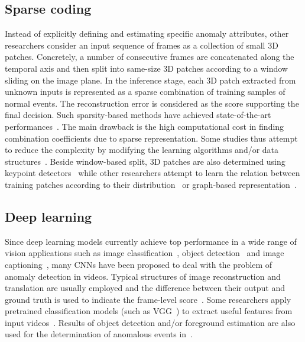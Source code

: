 \documentclass[10pt,twocolumn,letterpaper]{article}
\begin{document}
\subsection{Sparse coding}
Instead of explicitly defining and estimating specific anomaly attributes, other researchers consider an input sequence of frames as a collection of small 3D patches. Concretely, a number of consecutive frames are concatenated along the temporal axis and then split into same-size 3D patches according to a window sliding on the image plane. In the inference stage, each 3D patch extracted from unknown inputs is represented as a sparse combination of training samples of normal events. The reconstruction error is considered as the score supporting the final decision. Such sparsity-based methods have achieved state-of-the-art performances~\cite{Cong2011Sparse,Zhao2011Online}. The main drawback is the high computational cost in finding combination coefficients due to sparse representation. Some studies thus attempt to reduce the complexity by modifying the learning algorithms and/or data structures~\cite{Lu2013Abnormal,Luo2017A}. Beside window-based split, 3D patches are also determined using keypoint detectors~\cite{Cheng2015Video} while other researchers attempt to learn the relation between training patches according to their distribution~\cite{Mahadevan2010Anomaly} or graph-based representation~\cite{Kim2009Observe}.

\subsection{Deep learning}
Since deep learning models currently achieve top performance in a wide range of vision applications such as image classification~\cite{Krizhevsky2012ImageNet,Szegedy2015Going,He2016Deep}, object detection~\cite{Shaoqing2015Faster,He2017Mask} and image captioning~\cite{Johnson2016DenseCap,Karpathy2017Deep}, many CNNs have been proposed to deal with the problem of anomaly detection in videos. Typical structures of image reconstruction and translation are usually employed and the difference between their output and ground truth is used to indicate the frame-level score~\cite{Hasan2016Learning,Ravanbakhsh2017Abnormal,Wen2018Future}. Some researchers apply pretrained classification models (such as VGG~\cite{Simonyan2014Very}) to extract useful features from input videos~\cite{Sorina2017Deep,Ionescu2017Unmasking}. Results of object detection and/or foreground estimation are also used for the determination of anomalous events in~\cite{Hinami2017Joint,Xu2017Detecting}.
\end{document}
